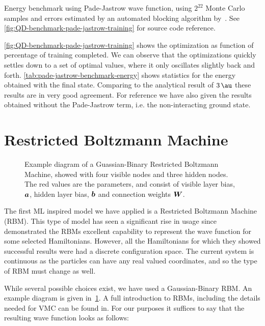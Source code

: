 \documentclass[Thesis.tex]{subfiles}
\begin{document}
\begin{table}[h]
  \centering
  
  \caption{Energy benchmark using Pade-Jastrow wave function, using $2^{22}$
    Monte Carlo samples and errors estimated by an automated blocking algorithm
    by~\textcite{Jonsson-2018}. See \cref{fig:QD-benchmark-pade-jastrow-training}
    for source code reference.}
  \label{tab:pade-jastrow-benchmark-energy}
\end{table}

\cref{fig:QD-benchmark-pade-jastrow-training} shows the optimization as function
of percentage of training completed. We can observe that the optimizations
quickly settles down to a set of optimal values, where it only oscillates
slightly back and forth. \cref{tab:pade-jastrow-benchmark-energy} shows
statistics for the energy obtained with the final state. Comparing to the
analytical result of $\SI{3}{\au}$ these results are in very good agreement. For
reference we have also given the results obtained without the Pade-Jastrow term,
i.e. the non-interacting ground state.

\section{Restricted Boltzmann Machine}

\begin{figure}[h]
  \centering
  
  \caption{Example diagram of a Guassian-Binary Restricted Boltzmann Machine, showed with four visible nodes
    and three hidden nodes. The red values are the parameters, and consist of
    visible layer bias, $\bm{a}$, hidden layer bias, $\bm{b}$ and connection
    weights $\bm{W}$.}
  \label{fig:rbm-diagram-example}
\end{figure}


The first ML inspired model we have applied is a Restricted Boltzmann Machine (RBM).
This type of model has seen a significant rise in usage
since~\textcite{Carleo602} demonstrated the RBMs excellent capability to
represent the wave function for some selected Hamiltonians. However, all the
Hamiltonians for which they showed successful results were had a discrete
configuration space. The current system is continuous as the particles can have
any real valued coordinates, and so the type of RBM must change as well.

While several possible choices exist, we have used a Gaussian-Binary RBM. An
example diagram is given in~\cref{fig:rbm-diagram-example}. A full
introduction to RBMs, including the details needed for VMC can be found
in\cite{Flugsrud-2018}. For our purposes it suffices to say that the resulting
wave function looks as follows:
\end{document}
